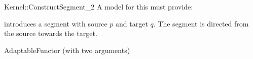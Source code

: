\begin{ccRefFunctionObjectConcept}{Kernel::ConstructSegment_2}
A model for this must provide:


            {introduces a segment  with source $p$
             and target $q$. The segment is directed from the source towards
             the target.}

\ccRefines
AdaptableFunctor (with two arguments)

\ccSeeAlso
{}\\

\end{ccRefFunctionObjectConcept}
